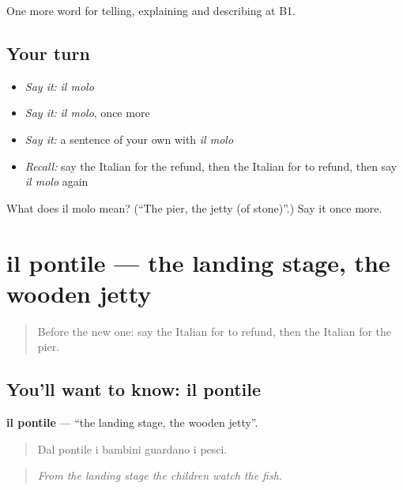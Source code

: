 \begin{grammarlens}[title={What you've built}]
One more word for telling, explaining and describing at B1.
\end{grammarlens}

\subsection*{Your turn}
\begin{itemize}
\raggedright
  \item \emph{Say it:} \emph{il molo}
  \item \emph{Say it:} \emph{il molo}, once more
  \item \emph{Say it:} a sentence of your own with \emph{il molo}
  \item \emph{Recall:} say the Italian for the refund, then the Italian for to refund, then say \emph{il molo} again
\end{itemize}

\begin{tcolorbox}[breakable,colback=teal!4,colframe=teal!35!black,title={Before you move on}]
What does il molo mean? (\textquotedblleft{}The pier, the jetty (of stone)\textquotedblright{}.) Say it once more.
\end{tcolorbox}
\section[il pontile]{il pontile — the landing stage, the wooden jetty}

\label{lesson:IT-C421-pontile}



\begin{quote}
Before the new one: say the Italian for to refund, then the Italian for the pier.
\end{quote}

\subsection*{You'll want to know: il pontile}
\textbf{il pontile} — \textquotedblleft{}the landing stage, the wooden jetty\textquotedblright{}.

\begin{quote}
Dal pontile i bambini guardano i pesci.
\end{quote}

\begin{quote}
\emph{From the landing stage the children watch the fish.}
\end{quote}

